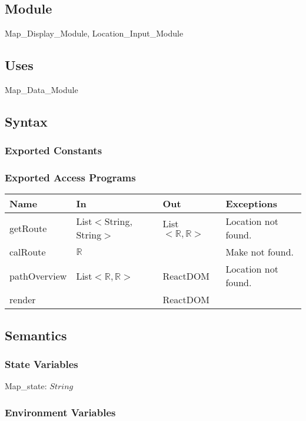 \documentclass[12pt, titlepage]{article}
\begin{document}
\subsection{Module}

Map\_Display\_Module, Location\_Input\_Module

\subsection{Uses}

Map\_Data\_Module

\subsection{Syntax}

\subsubsection{Exported Constants}

\subsubsection{Exported Access Programs}

\begin{tabular}{| l | l | l | l |}
  \hline
  \textbf{Name} & \textbf{In} & \textbf{Out} & \textbf{Exceptions}\\
  \hline
  getRoute & List$<$String, String$>$ & List$<\mathbb{R},\mathbb{R}>$ & Location not found.\\
  \hline
  calRoute & $\mathbb{R}$ & ~ & Make not found.\\
  \hline
  pathOverview & List$<\mathbb{R},\mathbb{R}>$ & ReactDOM & Location not found.\\
  render & ~ & ReactDOM & ~\\
  \hline
\end{tabular}


\subsection{Semantics}

\subsubsection{State Variables}

Map\_state: $String$

\subsubsection{Environment Variables}
\end{document}
